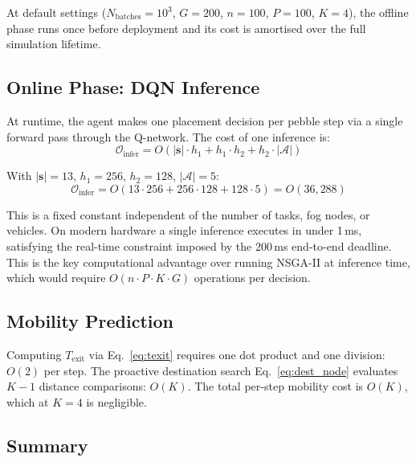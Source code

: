 \documentclass[12pt,a4paper]{article}
\theoremstyle{definition}
\theoremstyle{remark}
\begin{document}
At default settings ($N_{\text{batches}} = 10^3$, $G = 200$, $n = 100$,
$P = 100$, $K = 4$), the offline phase runs once before deployment and its
cost is amortised over the full simulation lifetime.

\subsection{Online Phase: DQN Inference}

At runtime, the agent makes one placement decision per pebble step via a
single forward pass through the Q-network. The cost of one inference is:
\begin{equation}
  \mathcal{O}_{\text{infer}} =
  O(|\mathbf{s}| \cdot h_1 + h_1 \cdot h_2 + h_2 \cdot |\mathcal{A}|)
  \label{eq:dqn_infer}
\end{equation}

With $|\mathbf{s}| = 13$, $h_1 = 256$, $h_2 = 128$, $|\mathcal{A}| = 5$:
\begin{equation}
  \mathcal{O}_{\text{infer}} = O(13 \cdot 256 + 256 \cdot 128 + 128 \cdot 5)
  = O(36,\!288)
  \label{eq:dqn_infer_numeric}
\end{equation}

This is a fixed constant independent of the number of tasks, fog nodes, or
vehicles. On modern hardware a single inference executes in under 1\,ms,
satisfying the real-time constraint imposed by the 200\,ms end-to-end deadline.
This is the key computational advantage over running NSGA-II at inference time,
which would require $O(n \cdot P \cdot K \cdot G)$ operations per decision.

\subsection{Mobility Prediction}

Computing $T_{\text{exit}}$ via Eq.~\eqref{eq:texit} requires one dot product
and one division: $O(2)$ per step. The proactive destination search
Eq.~\eqref{eq:dest_node} evaluates $K - 1$ distance comparisons: $O(K)$.
The total per-step mobility cost is $O(K)$, which at $K = 4$ is negligible.

\subsection{Summary}
\end{document}
